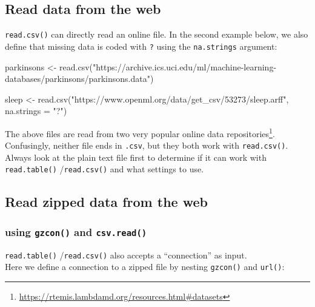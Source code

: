 \documentclass[
]{book}
\newenvironment{Shaded}{\begin{snugshade}}{\end{snugshade}}
\newcommand{\AttributeTok}[1]{\textcolor[rgb]{0.77,0.63,0.00}{#1}}
\newcommand{\FunctionTok}[1]{\textcolor[rgb]{0.00,0.00,0.00}{#1}}
\newcommand{\NormalTok}[1]{#1}
\newcommand{\OtherTok}[1]{\textcolor[rgb]{0.56,0.35,0.01}{#1}}
\newcommand{\StringTok}[1]{\textcolor[rgb]{0.31,0.60,0.02}{#1}}
\DeclareRobustCommand{\href}[2]{#2\footnote{\url{#1}}}
\begin{document}
\hypertarget{read-data-from-the-web}{%
\subsection{Read data from the web}\label{read-data-from-the-web}}

\texttt{read.csv()} can directly read an online file. In the second example below, we also define that missing data is coded with \texttt{?} using the \texttt{na.strings} argument:

\begin{Shaded}
\begin{Highlighting}[]
\NormalTok{parkinsons }\OtherTok{\textless{}{-}} \FunctionTok{read.csv}\NormalTok{(}\StringTok{"https://archive.ics.uci.edu/ml/machine{-}learning{-}databases/parkinsons/parkinsons.data"}\NormalTok{)}

\NormalTok{sleep }\OtherTok{\textless{}{-}} \FunctionTok{read.csv}\NormalTok{(}\StringTok{"https://www.openml.org/data/get\_csv/53273/sleep.arff"}\NormalTok{,}
                  \AttributeTok{na.strings =} \StringTok{"?"}\NormalTok{)}
\end{Highlighting}
\end{Shaded}

The above files are read from two very popular online \href{https://rtemis.lambdamd.org/resources.html\#datasets}{data repositories}. Confusingly, neither file ends in \texttt{.csv}, but they both work with \texttt{read.csv()}. Always look at the plain text file first to determine if it can work with \texttt{read.table()} /\texttt{read.csv()} and what settings to use.

\hypertarget{read-zipped-data-from-the-web}{%
\subsection{Read zipped data from the web}\label{read-zipped-data-from-the-web}}

\hypertarget{using-gzcon-and-csv.read}{%
\subsubsection{\texorpdfstring{using \texttt{gzcon()} and \texttt{csv.read()}}{using gzcon() and csv.read()}}\label{using-gzcon-and-csv.read}}

\texttt{read.table()} /\texttt{read.csv()} also accepts a ``connection'' as input.\\
Here we define a connection to a zipped file by nesting \texttt{gzcon()} and \texttt{url()}:
\end{document}
